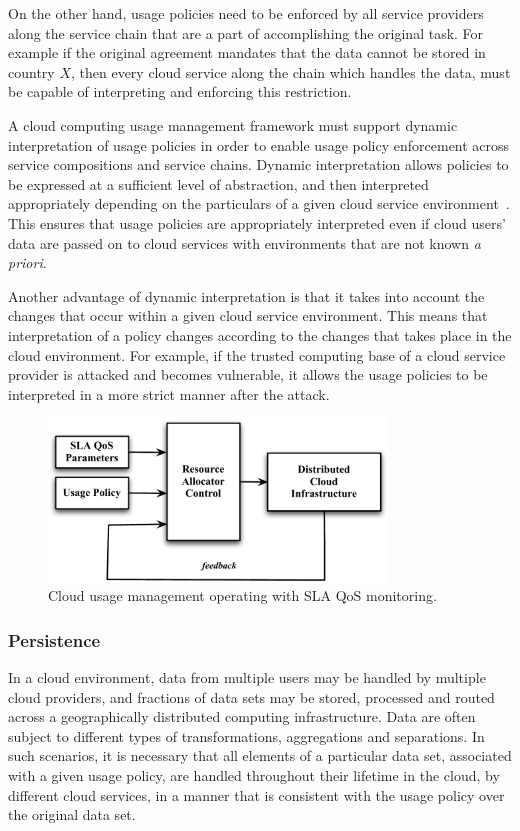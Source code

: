 \documentclass[10pt,letterpaper]{book}
\begin{document}
On the other hand, usage policies need to be enforced by all service providers along the service chain that are a part of accomplishing the original task. For example if the original agreement mandates that the data cannot be stored in country $X$, then every cloud service along the chain which handles the data, must be capable of interpreting and enforcing this restriction. 

A cloud computing usage management framework must support dynamic interpretation of usage policies in order to enable usage policy enforcement across  service compositions and service chains. Dynamic interpretation allows policies to be expressed at a sufficient level of abstraction, and then interpreted appropriately depending on the particulars of a given cloud service environment~\cite{JaHeLa:10}. This ensures that usage policies are appropriately interpreted even if cloud users' data are passed on to cloud services with environments that are not known {\it a priori}. 

Another advantage of dynamic interpretation is that it takes into account the changes that occur within a given cloud service environment. This means that interpretation of a policy changes according to the changes that takes place in the cloud environment. For example, if the trusted computing base of a cloud service provider is attacked and becomes vulnerable, it allows the usage policies to be interpreted in a more strict manner after the attack. 

\begin{figure}[t]
\centering
\includegraphics[width=9cm]{sla-usage}
\caption{Cloud usage management operating with SLA QoS monitoring.}
\label{fig:sla-usage}
\end{figure}

\subsubsection {Persistence}
In a cloud environment, data from multiple users may be handled by multiple cloud providers, and fractions of data sets may be stored, processed and routed across a geographically distributed computing infrastructure. Data are often subject to different types of transformations, aggregations and separations.  In such scenarios, it is necessary that all elements of a particular data set, associated with a given usage policy, are handled throughout their lifetime in the cloud, by different cloud services, in a manner that is consistent with the usage policy over the original data set. 
\end{document}
